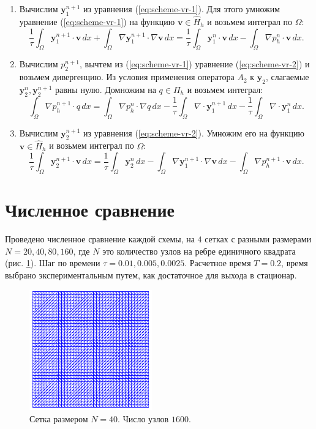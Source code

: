\documentclass[12pt]{article}
\begin{document}
\begin{enumerate}
\item Вычислим ${\bm y}_1^{n+1}$ из уравнения (\ref{eq:scheme-vr-1}). Для этого умножим уравнение (\ref{eq:scheme-vr-1}) на функцию ${\bm v} \in \hat H_h$ и возьмем интеграл по $\Omega$:
$$
\frac{1}{\tau}\int_{\Omega} {\bm y}_1^{n+1} \cdot {\bm v} \, dx + \int_{\Omega} \nabla {\bm y}_1^{n+1} \cdot \nabla {\bm v} \, dx  = \frac{1}{\tau} \int_{\Omega} {\bm y}_1^{n} \cdot {\bm v} \, dx - \int_{\Omega} \nabla p_h^n \cdot {\bm v} \, dx.
$$
\item Вычислим $p_2^{n+1}$, вычтем из (\ref{eq:scheme-vr-1}) уравнение (\ref{eq:scheme-vr-2}) и возьмем дивергенцию. Из условия применения оператора $A_2$ к ${\bm y}_2$, слагаемые ${\bm y}_2^n, {\bm y}_2^{n+1}$ равны нулю. Домножим на $q \in \Pi_h$ и возьмем интеграл:
$$
\int_{\Omega} \nabla p_h^{n+1} \cdot q \, dx = \int_{\Omega} \nabla p_h^n \cdot \nabla q \, dx - \frac{1}{\tau}\int_{\Omega}\nabla\cdot{\bm y}_1^{n+1}\, dx - \frac{1}{\tau}\int_{\Omega}\nabla\cdot{\bm y}_1^n \, dx.
$$
\item Вычислим ${\bm y}_2^{n+1}$ из уравнения (\ref{eq:scheme-vr-2}). Умножим его на функцию ${\bm v} \in \hat H_h$ и возьмем интеграл по $\Omega$:
$$
\frac{1}{\tau}\int_{\Omega}{\bm y}_2^{n+1} \cdot {\bm v} \, dx = \frac{1}{\tau} \int_{\Omega} {\bm y}_2^n \, dx - \int_{\Omega}\nabla {\bm y}_1^{n+1} \cdot \nabla {\bm v} \, dx - \int_{\Omega} \nabla p_h^{n+1} \cdot {\bm v} \, dx.
$$
\end{enumerate}


\section{Численное сравнение}
Проведено численное сравнение каждой схемы, на $4$ сетках  с разными размерами $N = 20, 40, 80, 160$, где $N$ это количество узлов на ребре единичного квадрата (рис. \ref{fg:scheme-mesh}). Шаг по времени $\tau = 0.01, 0.005, 0.0025$. Расчетное время $T=0.2$, время выбрано экспериментальным путем, как достаточное для выхода в стационар.

\begin{figure}
	\begin{center}
		\includegraphics[width=200px]{pics/mesh}
		\caption{Сетка размером $N=40$. Число узлов $1600$.}
		\label{fg:scheme-mesh}
	\end{center}
\end{figure}
\end{document}
